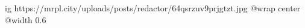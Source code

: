  
 
 
 
 

\ifcmt
  ig https://mrpl.city/uploads/posts/redactor/64qsrzuv9prjgtzt.jpg
  @wrap center
  @width 0.6
\fi
